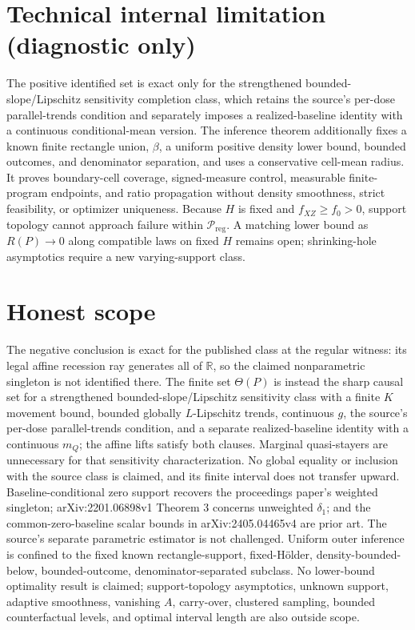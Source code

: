 \documentclass{article}
\begin{document}
\section*{Technical internal limitation (diagnostic only)}

The positive identified set is exact only for the strengthened bounded-slope/Lipschitz sensitivity completion class, which retains the source's per-dose parallel-trends condition and separately imposes a realized-baseline identity with a continuous conditional-mean version. The inference theorem additionally fixes a known finite rectangle union, \(\beta\), a uniform positive density lower bound, bounded outcomes, and denominator separation, and uses a conservative cell-mean radius. It proves boundary-cell coverage, signed-measure control, measurable finite-program endpoints, and ratio propagation without density smoothness, strict feasibility, or optimizer uniqueness. Because \(H\) is fixed and \(f_{XZ}\ge f_0>0\), support topology cannot approach failure within \(\mathcal P_{\mathrm{reg}}\). A matching lower bound as \(R(P)\to0\) along compatible laws on fixed \(H\) remains open; shrinking-hole asymptotics require a new varying-support class.

\section{Honest scope}

The negative conclusion is exact for the published class at the regular witness: its legal affine recession ray generates all of \(\mathbb R\), so the claimed nonparametric singleton is not identified there. The finite set \(\Theta(P)\) is instead the sharp causal set for a strengthened bounded-slope/Lipschitz sensitivity class with a finite \(K\) movement bound, bounded globally \(L\)-Lipschitz trends, continuous \(g\), the source's per-dose parallel-trends condition, and a separate realized-baseline identity with a continuous \(m_Q\); the affine lifts satisfy both clauses. Marginal quasi-stayers are unnecessary for that sensitivity characterization. No global equality or inclusion with the source class is claimed, and its finite interval does not transfer upward. Baseline-conditional zero support recovers the proceedings paper's weighted singleton; arXiv:2201.06898v1 Theorem 3 concerns unweighted \(\delta_1\); and the common-zero-baseline scalar bounds in arXiv:2405.04465v4 are prior art. The source's separate parametric estimator is not challenged. Uniform outer inference is confined to the fixed known rectangle-support, fixed-H\"older, density-bounded-below, bounded-outcome, denominator-separated subclass. No lower-bound optimality result is claimed; support-topology asymptotics, unknown support, adaptive smoothness, vanishing \(A\), carry-over, clustered sampling, bounded counterfactual levels, and optimal interval length are also outside scope.
\end{document}
